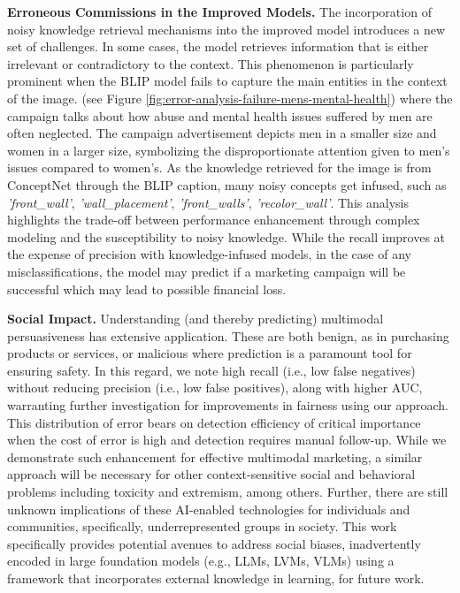 \noindent \textbf{Erroneous Commissions in the Improved Models.}  The incorporation of noisy knowledge retrieval mechanisms into the improved model introduces a new set of challenges. In some cases, the model retrieves information that is either irrelevant or contradictory to the context.
This phenomenon is particularly prominent when the BLIP model fails to capture the main entities in the context of the image. 
(see Figure \ref{fig:error-analysis-failure-mens-mental-health}) where the campaign talks about how abuse and mental health issues suffered by men are often neglected.
The campaign advertisement depicts men in a smaller size and women in a larger size, symbolizing the disproportionate attention given to men’s issues compared to women's. 
As the knowledge retrieved for the image is from ConceptNet through the BLIP caption, many noisy concepts get infused, such as \textit{'front\_wall'}, \textit{'wall\_placement'}, \textit{'front\_walls'}, \textit{'recolor\_wall'}. %
This analysis highlights the trade-off between performance enhancement through complex modeling and the susceptibility to noisy knowledge. While the recall improves at the expense of precision with knowledge-infused models, in the case of any misclassifications, the model may predict if a marketing campaign will be successful which may lead to possible financial loss.

\noindent \textbf{Social Impact.} Understanding (and thereby predicting) multimodal persuasiveness has extensive application. These are both benign, as in purchasing products or services, or malicious where prediction is a paramount tool for ensuring safety. In this regard, we note high recall (i.e., low false negatives) without reducing precision (i.e., low false positives), along with higher AUC, warranting further investigation for improvements in fairness using our approach. This distribution of error bears on detection efficiency of critical importance when the cost of error is high and detection requires manual follow-up. While we demonstrate such enhancement for effective multimodal marketing, a similar approach will be necessary for other context-sensitive social and behavioral problems including toxicity and extremism, among others. Further, there are still unknown implications of these AI-enabled technologies for individuals and communities, specifically, underrepresented groups in society. This work specifically provides potential avenues to address social biases, inadvertently encoded in large foundation models (e.g., LLMs, LVMs, VLMs) using a framework that incorporates external knowledge in learning, for future work.

